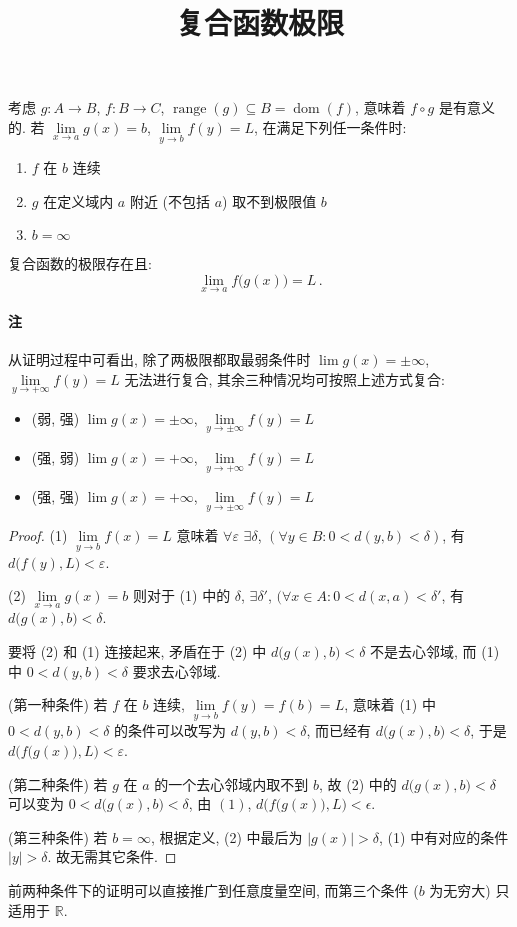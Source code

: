 \documentclass[UTF8]{ctexart}
\title{复合函数极限}
\date{}
\newcommand{\R}{\mathbb R}
\begin{document}
\maketitle
\vspace{-4em}

考虑 $ g \colon A \to B $, $ f \colon B \to C $, $ \operatorname{range}(g) \subseteq B = \operatorname{dom}(f) $, 意味着 $ f \circ g $ 是有意义的. 若 $ \lim\limits_{x \to a} g(x) = b $, $ \lim\limits_{y \to b} f(y) = L $, 在满足下列任一条件时:
\begin{enumerate}
	\item $ f $ 在 $ b $ 连续
	\item $ g $ 在定义域内 $ a $ 附近 (不包括 $ a $) 取不到极限值 $ b $
	\item $ b = \infty $
\end{enumerate}

复合函数的极限存在且:
\[
	\lim_{x \to a} f \big( g(x) \big) = L \,.
\]

\paragraph{注}
从证明过程中可看出, 除了两极限都取最弱条件时 $ \lim g(x) = \pm\infty $, $ \lim\limits_{y \to + \infty} f(y) = L $ 无法进行复合, 其余三种情况均可按照上述方式复合: 
\begin{itemize}
	\item (弱, 强) $ \lim g(x) = \pm \infty $, $ \lim\limits_{y \to \pm \infty} f(y) = L $
	\item (强, 弱) $ \lim g(x) = + \infty $, $ \lim\limits_{y \to + \infty} f(y) = L $
	\item (强, 强) $ \lim g(x) = + \infty $, $ \lim\limits_{y \to \pm \infty} f(y) = L $
\end{itemize}

\begin{proof}
	(1) $ \lim\limits_{y \to b} f(x) = L $ 意味着 $ \forall \varepsilon $ $ \exists \delta $, $ (\forall y \in B \colon 0 < d(y, b) < \delta) $, 有 $ d \big( f(y), L \big) < \varepsilon $.

	(2) $ \lim\limits_{x \to a} g(x) = b $ 则对于 (1) 中的 $ \delta $, $ \exists \delta' $, $ ( \forall x \in A \colon 0 < d(x, a) < \delta' $, 有 $ d \big( g(x), b \big) < \delta $.

	要将 (2) 和 (1) 连接起来, 矛盾在于 (2) 中 $ d \big( g(x), b \big) < \delta $ 不是去心邻域, 而 (1) 中 $ 0 < d(y, b) < \delta $ 要求去心邻域.

	(第一种条件) 若 $ f $ 在 $ b $ 连续, $ \lim\limits_{y \to b} f(y) = f(b) = L $, 意味着 (1) 中 $ 0 < d(y, b) < \delta $ 的条件可以改写为 $ d(y, b) < \delta $, 而已经有 $ d \big( g(x), b \big) < \delta $, 于是 $ d \Big( f \big( g(x) \big), L \Big) < \varepsilon $.

	(第二种条件) 若 $ g $ 在 $ a $ 的一个去心邻域内取不到 $ b $, 故 (2) 中的 $ d \big( g(x), b \big) < \delta $ 可以变为 $ 0 < d \big( g(x), b \big) < \delta $, 由 $ (1) $, $ d \Big( f \big( g(x) \big), L \Big) < \epsilon $.

	(第三种条件) 若 $ b = \infty $, 根据定义, (2) 中最后为 $ |g(x)| > \delta $, (1) 中有对应的条件 $ |y| > \delta $. 故无需其它条件.
\end{proof}

前两种条件下的证明可以直接推广到任意度量空间, 而第三个条件 ($ b $ 为无穷大) 只适用于 $ \R $.
\end{document}
